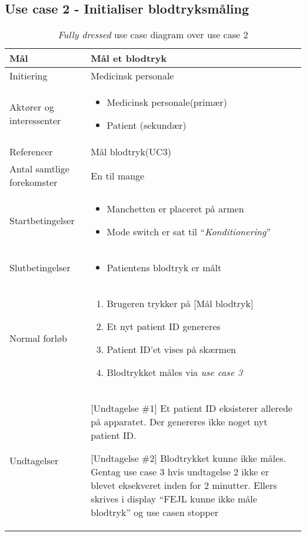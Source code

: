 	\subsection{Use case 2 - Initialiser blodtryksmåling }
	\begin{table}[H]
		\begin{center}
			\begin{tabular}{ | p{} | p{}| } 
				\hline
				Mål& Mål et blodtryk\\ 
				\hline
				Initiering &  Medicinsk personale\\
				\hline
				Aktører og interessenter & 
				\begin{itemize}
					\item Medicinsk personale(primær)
					\item Patient (sekundær)
				\end{itemize} \\ 
				\hline
				Referencer & Mål blodtryk(UC3) \\ 
				\hline
				Antal samtlige forekomster & En til mange\\ 
				\hline	
				Startbetingelser & 
				\begin{itemize}
					\item Manchetten er placeret på armen
					\item Mode switch er sat til “\textit{Konditionering}”
				\end{itemize} \\ 
				\hline
				Slutbetingelser & 
				\begin{itemize}
					\item Patientens blodtryk er målt
				\end{itemize} \\ 
				\hline
				Normal forløb & \begin{enumerate}
					\setlength\itemsep{0cm} %
					\item Brugeren trykker på [Mål blodtryk]
					\item Et nyt patient ID genereres
					\subitem [Undtagelse \#1] 
					\item Patient ID’et vises på skærmen
					\item Blodtrykket måles via \textit{use case 3}
					\subitem [Undtagelse \#2]
				\end{enumerate} \\ 
				\hline
				Undtagelser &  [Undtagelse \#1] Et patient ID eksisterer allerede på apparatet. Der genereres ikke noget nyt patient ID.
				
				[Undtagelse \#2] Blodtrykket kunne ikke måles. Gentag use case 3 hvis undtagelse 2 ikke er blevet eksekveret inden for 2 minutter. Ellers skrives i display “FEJL kunne ikke måle blodtryk” og use casen stopper\\ 
				\hline
				
			\end{tabular}
		\end{center}
		\caption{\textit{Fully dressed} use case diagram over use case 2}
			\end{table}
		\newpage